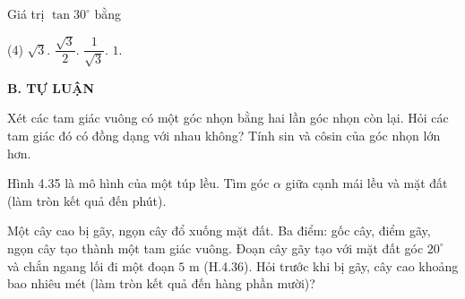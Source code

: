 \begin{exercises}
\begin{questions}[resume=SGK]
        \item Giá trị $\tan 30^\circ$ bằng
        \begin{tasks}(4)
            \task $\sqrt{3}$.
            \task $\dfrac{\sqrt{3}}{2}$.
            \task $\dfrac{1}{\sqrt{3}}$.
            \task $1$.
        \end{tasks}
        \par\noindent\answerbox\par
    \end{questions}

    \textbf{B. TỰ LUẬN}

    \begin{questions}[resume=SGK]
        \item Xét các tam giác vuông có một góc nhọn bằng hai lần góc nhọn còn lại. Hỏi các tam giác đó có đồng dạng với nhau không? Tính sin và côsin của góc nhọn lớn hơn.

        \answerline
        \answerline
        \answerline

        \item Hình 4.35 là mô hình của một túp lều. Tìm góc $\alpha$ giữa cạnh mái lều và mặt đất (làm tròn kết quả đến phút).

        \begin{center}
        \end{center}

        \answerline
        \answerline

        \item Một cây cao bị gãy, ngọn cây đổ xuống mặt đất. Ba điểm: gốc cây, điểm gãy, ngọn cây tạo thành một tam giác vuông. Đoạn cây gãy tạo với mặt đất góc $20^\circ$ và chắn ngang lối đi một đoạn $5$ m (H.4.36). Hỏi trước khi bị gãy, cây cao khoảng bao nhiêu mét (làm tròn kết quả đến hàng phần mười)?


\end{questions}
\end{exercises}
